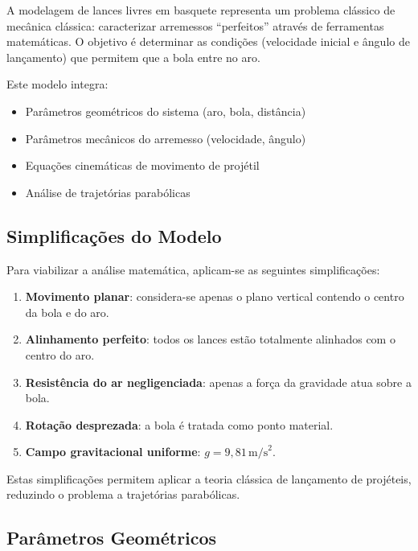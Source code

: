 \documentclass[12pt,a4paper]{article}
\begin{document}
A modelagem de lances livres em basquete representa um problema clássico de mecânica clássica: caracterizar arremessos ``perfeitos'' através de ferramentas matemáticas. O objetivo é determinar as condições (velocidade inicial e ângulo de lançamento) que permitem que a bola entre no aro.

Este modelo integra:
\begin{itemize}
    \item Parâmetros geométricos do sistema (aro, bola, distância)
    \item Parâmetros mecânicos do arremesso (velocidade, ângulo)
    \item Equações cinemáticas de movimento de projétil
    \item Análise de trajetórias parabólicas
\end{itemize}

\subsection{Simplificações do Modelo}

Para viabilizar a análise matemática, aplicam-se as seguintes simplificações:

\begin{enumerate}
    \item \textbf{Movimento planar}: considera-se apenas o plano vertical contendo o centro da bola e do aro.
    
    \item \textbf{Alinhamento perfeito}: todos os lances estão totalmente alinhados com o centro do aro.
    
    \item \textbf{Resistência do ar negligenciada}: apenas a força da gravidade atua sobre a bola.
    
    \item \textbf{Rotação desprezada}: a bola é tratada como ponto material.
    
    \item \textbf{Campo gravitacional uniforme}: $g = 9,81 \, \text{m/s}^2$.
\end{enumerate}

Estas simplificações permitem aplicar a teoria clássica de lançamento de projéteis, reduzindo o problema a trajetórias parabólicas.

\subsection{Parâmetros Geométricos}
\end{document}
